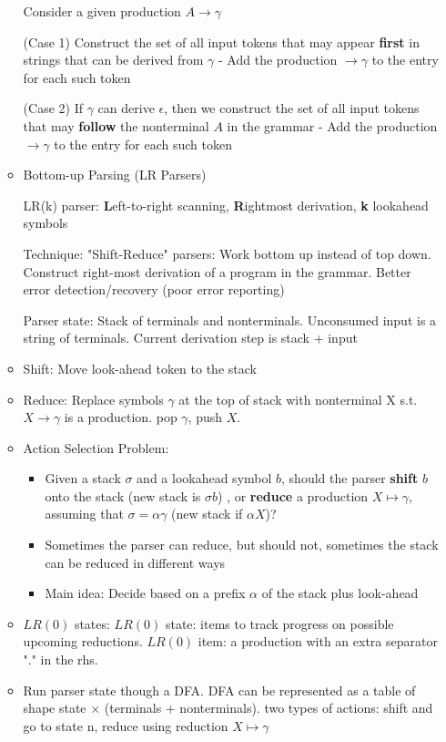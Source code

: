 \begin{itemize}
\begin{itemize}
		Consider a given production $A \rightarrow \gamma$
		
		(Case 1) Construct the set of all input tokens that may appear \textbf{first} in strings that can be derived from $\gamma$ - Add the production $\rightarrow \gamma$ to the entry for each such token
		
		(Case 2) If $\gamma$ can derive $\epsilon$, then we construct the set of all input tokens that may \textbf{follow} the nonterminal $A$ in the grammar - Add the production $\rightarrow \gamma$ to the entry for each such token
		\item Bottom-up Parsing (LR Parsers)
		
		LR(k) parser: \textbf{L}eft-to-right scanning, \textbf{R}ightmost derivation, \textbf{k} lookahead symbols
		
		Technique: "Shift-Reduce" parsers: Work bottom up instead of top down. Construct right-most derivation of a program in the grammar. Better error detection/recovery (poor error reporting)
		
		Parser state: Stack of terminals and nonterminals. Unconsumed input is a string of terminals. Current derivation step is stack + input
		
		\item Shift: Move look-ahead token to the stack
		\item Reduce: Replace symbols $\gamma$ at the top of stack with nonterminal X s.t.  $X \rightarrow \gamma$ is a production. pop $\gamma$, push $X$. 	
		\item Action Selection Problem:
		\begin{itemize}
		\item Given a stack $\sigma$ and a lookahead symbol $b$, should the parser \textbf{shift} $b$ onto the stack (new stack is $\sigma b$) , or \textbf{reduce} a production $X \mapsto \gamma$, assuming that $\sigma = \alpha \gamma$ (new stack if $\alpha X$)?
		\item Sometimes the parser can reduce, but should not, sometimes the stack can be reduced in different ways
		\item Main idea: Decide based on a prefix $\alpha$ of the stack plus look-ahead
		\end{itemize}
		\item $LR(0)$ states: $LR(0)$ state: items to track progress on possible upcoming reductions. $LR(0)$ item: a production with an extra separator "." in the rhs.
		\item Run parser state though a DFA. DFA can be represented as a table of shape state $\times$ (terminals + nonterminals). two types of actions: shift and go to state n, reduce using reduction $X \mapsto \gamma$
	\end{itemize}
\end{itemize}


